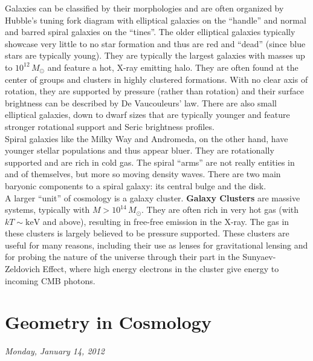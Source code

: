 \documentclass[10pt]{article}
\numberwithin{equation}{section}
\newcommand{\n}{\noindent}
\begin{document}
	\n Galaxies can be classified by their morphologies and are often organized by Hubble's tuning fork diagram with elliptical galaxies on the ``handle'' and normal and barred spiral galaxies on the ``tines''. The older elliptical galaxies typically showcase very little to no star formation and thus are red and ``dead'' (since blue stars are typically young). They are typically the largest galaxies with masses up to $10^{12}\,M_\odot$ and feature a hot, X-ray emitting halo. They are often found at the center of groups and clusters in highly clustered formations. With no clear axis of rotation, they are supported by pressure (rather than rotation) and their surface brightness can be described by De Vaucouleurs' law. There are also small elliptical galaxies, down to dwarf sizes that are typically younger and feature stronger rotational support and Seric brightness profiles.\\
	
	\n Spiral galaxies like the Milky Way and Andromeda, on the other hand, have younger stellar populations and thus appear bluer. They are rotationally supported and are rich in cold gas. The spiral ``arms'' are not really entities in and of themselves, but more so moving density waves. There are two main baryonic components to a spiral galaxy: its central bulge and the disk.\\
	
	\n A larger ``unit'' of cosmology is a galaxy cluster. \textbf{Galaxy Clusters} are massive systems, typically with $M> 10^{14}\,M_\odot$. They are often rich in very hot gas (with $kT\sim \mathrm{keV}$ and above), resulting in free-free emission in the X-ray. The gas in these clusters is largely believed to be pressure supported. These clusters are useful for many reasons, including their use as lenses for gravitational lensing and for probing the nature of the universe through their part in the Sunyaev-Zeldovich Effect, where high energy electrons in the cluster give energy to incoming CMB photons.


\section{Geometry in Cosmology} %
\label{sec:geometry_in_cosmology}
	\emph{Monday, January 14, 2012}\\
\end{document}
